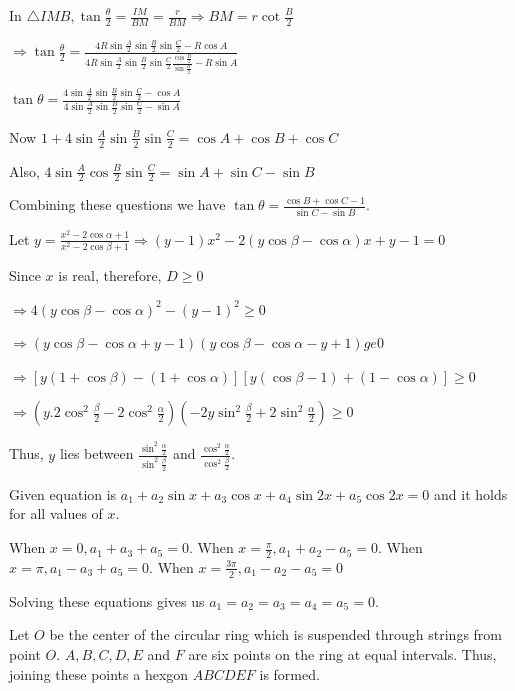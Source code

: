   In $\triangle IMB, \tan\frac{\theta}{2} = \frac{IM}{BM} = \frac{r}{BM} \Rightarrow BM = r\cot\frac{B}{2}$

  $\Rightarrow \tan\frac{\theta}{2} = \frac{4R\sin\frac{A}{2}\sin\frac{B}{2}\sin\frac{C}{2} - R\cos
    A}{4R\sin\frac{A}{2}\sin\frac{B}{2}\sin\frac{C}{2}\frac{\cos\frac{B}{2}}{\sin\frac{B}{2}} - R\sin A}$

  $\tan\theta = \frac{4\sin\frac{A}{2}\sin\frac{B}{2}\sin\frac{C}{2} - \cos
    A}{4\sin\frac{A}{2}\sin\frac{B}{2}\sin\frac{C}{2} - \sin A}$

  Now $1 + 4\sin\frac{A}{2}\sin\frac{B}{2}\sin\frac{C}{2} = \cos A + \cos B + \cos C$

  Also, $4\sin\frac{A}{2}\cos\frac{B}{2}\sin\frac{C}{2} = \sin A + \sin C - \sin B$

  Combining these questions we have $\tan\theta = \frac{\cos B + \cos C - 1}{\sin C - \sin B}$.
\item Let $y = \frac{x^2 - 2\cos\alpha + 1}{x^2 - 2\cos\beta + 1} \Rightarrow (y - 1)x^2 - 2(y\cos\beta
  - \cos\alpha)x + y - 1 = 0$

  Since $x$ is real, therefore, $D \ge 0$

  $\Rightarrow 4(y\cos\beta - \cos\alpha)^2 - (y - 1)^2\ge 0 $

  $\Rightarrow (y\cos\beta - \cos\alpha + y - 1)(y\cos\beta - \cos\alpha - y + 1)ge 0$

  $\Rightarrow [y(1 + \cos\beta) - (1 + \cos\alpha)][y(\cos\beta - 1) + (1 - \cos\alpha)]\ge 0$

  $\Rightarrow \left(y.2\cos^2\frac{\beta}{2} -
  2\cos^2\frac{\alpha}{2}\right)\left(-2y\sin^2\frac{\beta}{2} + 2\sin^2\frac{\alpha}{2}\right)\ge 0$

  Thus, $y$ lies between $\frac{\sin^2\frac{\alpha}{2}}{\sin^2\frac{\beta}{2}}$ and
  $\frac{\cos^2\frac{\alpha}{2}}{\cos^2\frac{\beta}{2}}$.
\item Given equation is $a_1 + a_2\sin x + a_3\cos x + a_4\sin2x + a_5\cos2x = 0$ and it holds for all
  values of $x$.

  When $x = 0, a_1 + a_3 + a_5 = 0$. When $x = \frac{\pi}{2}, a_1 + a_2 - a_5 = 0$. When $x = \pi, a_1 - a_3
  + a_5 = 0$. When $x = \frac{3\pi}{2}, a_1 - a_2 - a_5 = 0$

  Solving these equations gives us $a_1 = a_2 = a_3 = a_4 = a_5 = 0$.
\item Let $O$ be the center of the circular ring which is suspended through strings from point $O$. $A, B,
  C, D, E$ and $F$ are six points on the ring at equal intervals. Thus, joining these points a hexgon
  $ABCDEF$ is formed.

